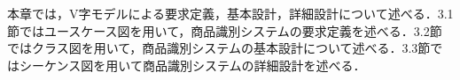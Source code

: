 

本章では，V字モデルによる要求定義，基本設計，詳細設計について述べる．3.1節ではユースケース図を用いて，商品識別システムの要求定義を述べる．3.2節ではクラス図を用いて，商品識別システムの基本設計について述べる．3.3節ではシーケンス図を用いて商品識別システムの詳細設計を述べる．

